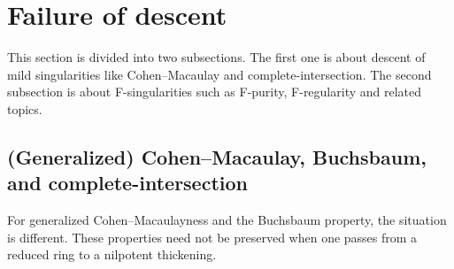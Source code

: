 \documentclass[10pt,a4paper]{amsart}
\newtheorem{lemma}[theorem]{Lemma}
\theoremstyle{definition}
\theoremstyle{remark}
\newtheorem{remark}[theorem]{Remark}
\begin{document}
 

\section{Failure of descent}

This section is divided into two subsections. 
The first one is about descent of mild singularities like Cohen--Macaulay and complete-intersection. The second subsection
is about F-singularities such as F-purity, F-regularity and related topics.

 
\subsection{(Generalized) Cohen--Macaulay, Buchsbaum, and complete-intersection}
For generalized Cohen--Macaulayness and the Buchsbaum property, the
situation is different. These properties need not be preserved when
one passes from a reduced ring to a nilpotent thickening.
\end{document}
